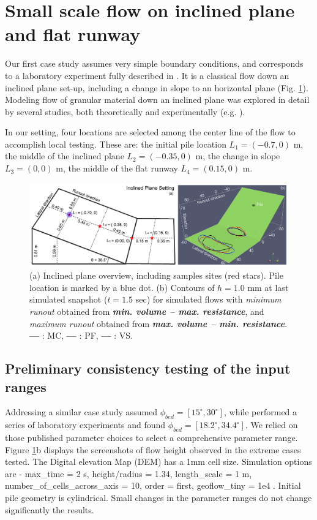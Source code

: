\documentclass{article}
\begin{document}
\section{Small scale flow on inclined plane and flat runway}\label{sec:QoIs}
Our first case study assumes very simple boundary conditions, and corresponds to a laboratory experiment fully described in \cite{Webb2004, Bursik2005, WebbBursik2016}. It is a classical flow down an inclined plane set-up, including a change in slope to an horizontal plane (Fig. \ref{fig:Ramp-first}). Modeling flow of granular material down an inclined plane was explored in detail by several studies, both theoretically and experimentally (e.g. \cite{RuyerQuil2000, Silbert2001, Pitman2003b}).

In our setting, four locations are selected among the center line of the flow to accomplish local testing. These are: the initial pile location $L_1=(-0.7,0)$ m, the middle of the inclined plane $L_2=(-0.35,0)$ m, the change in slope $L_3=(0,0)$ m, the middle of the flat runway $L_4=(0.15,0)$ m.
\begin{figure}[H]
    \includegraphics[width=1\textwidth]{InclinedPlane/InclPlane_new.jpg}
    \centering
    \caption{(a) Inclined plane overview, including samples sites (red stars). Pile location is marked by a blue dot. (b) Contours of $h = 1.0$ mm at last simulated snapshot ($t = 1.5$ sec) for simulated flows with \emph{minimum runout} obtained from \emph{\textbf{min. volume -- max. resistance}}, and \emph{maximum runout} obtained from \emph{\textbf{max. volume -- min. resistance}}. {\color{red} \textbf{---}} : MC, {\color{blue} \textbf{---}} : PF, \textbf{---} : VS.} \label{fig:Ramp-first}
\end{figure}

\subsection{Preliminary consistency testing of the input ranges}\label{consistency}
Addressing a similar case study \cite{Dalbey2008} assumed $\phi_{bed}=[15^\mathrm{\circ}, 30^\mathrm{\circ}]$, while \cite{WebbBursik2016} performed a series of laboratory experiments and found $\phi_{bed}=[18.2^\mathrm{\circ}, 34.4^\mathrm{\circ}]$. We relied on those published parameter choices to select a comprehensive parameter range. Figure \ref{fig:Ramp-first}b displays the screenshots of flow height observed in the extreme cases tested. The Digital elevation Map (DEM) has a 1mm cell size. Simulation options are - max\_time = 2 s, height/radius = 1.34, length\_scale = 1 m, number\_of\_cells\_across\_axis = 10, order = first, geoflow\_tiny = 1e4 \citep{Patra2005,Aghakhani2016}. Initial pile geometry is cylindrical. Small changes in the parameter ranges do not change significantly the results.
\end{document}
